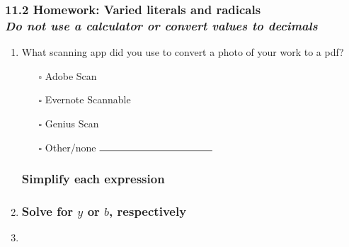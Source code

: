 \documentclass[12pt, twoside]{article}
\begin{document}
\subsubsection*{11.2 Homework: Varied literals and radicals \\
\emph{Do not use a calculator or convert values to decimals}}

\begin{enumerate}

  \item What scanning app did you use to convert a photo of your work to a pdf?
  \begin{multicols}{2}
    \begin{itemize}
      \item[$\square$] Adobe Scan
      \item[$\square$] Evernote Scannable
      \item[$\square$] Genius Scan
      \item[$\square$] Other/none $\rule{4cm}{0.15mm}$
    \end{itemize}
  \end{multicols}

\subsubsection*{Simplify each expression}
\item 
\begin{enumerate}[itemsep=2cm]
  \end{enumerate} \vspace{2cm}

\subsubsection*{Solve for $y$ or $b$, respectively}

\item 
\begin{enumerate}
  \end{enumerate} \vspace{3cm}


\end{enumerate}
\end{document}
